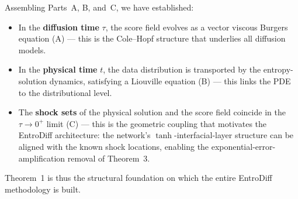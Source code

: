 Assembling Parts~A, B, and~C, we have established:
\begin{itemize}
\item In the \textbf{diffusion time} $\tau$, the score field evolves as a vector viscous Burgers equation (A) --- this is the Cole--Hopf structure that underlies all diffusion models.
\item In the \textbf{physical time} $t$, the data distribution is transported by the entropy-solution dynamics, satisfying a Liouville equation (B) --- this links the PDE to the distributional level.
\item The \textbf{shock sets} of the physical solution and the score field coincide in the $\tau \to 0^{+}$ limit (C) --- this is the geometric coupling that motivates the EntroDiff architecture: the network's $\tanh$-interfacial-layer structure can be aligned with the known shock locations, enabling the exponential-error-amplification removal of Theorem~3.
\end{itemize}

Theorem~1 is thus the structural foundation on which the entire EntroDiff methodology is built.

